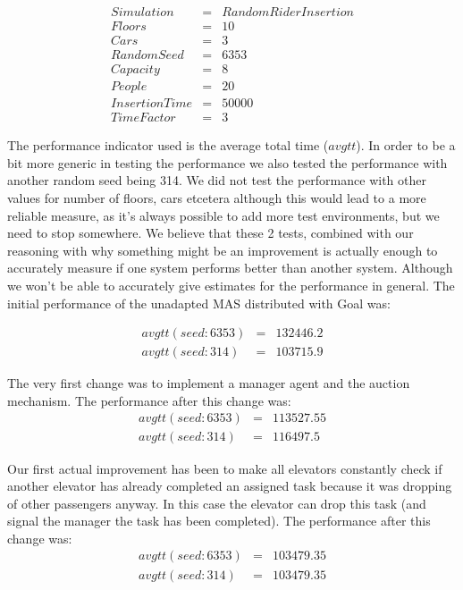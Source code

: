 \documentclass[a4paper,11pt]{article}
\begin{document}
\[\begin{array}{lcl}
Simulation & = & Random Rider Insertion\\
Floors & = & 10\\
Cars & = & 3\\
RandomSeed & = & 6353\\
Capacity & = & 8\\
People & = & 20\\
InsertionTime & = & 50000\\
TimeFactor & = & 3
\end{array}\] 

\pagebreak

The performance indicator used is the average total time ($avgtt$). In order to be a bit more generic in testing the performance we also tested the performance with another random seed being 314. We did not test the performance with other values for number of floors, cars etcetera although this would lead to a more reliable measure, as it's always possible to add more test environments, but we need to stop somewhere. We believe that these 2 tests, combined with our reasoning with why something might be an improvement is actually enough to accurately measure if one system performs better than another system. Although we won't be able to accurately give estimates for the performance in general.
\newline\newline
The initial performance of the unadapted MAS distributed with Goal was:

\[\begin{array}{lcl}
avgtt (seed: 6353) & = & 132446.2\\
avgtt (seed: 314) & = & 103715.9
\end{array}\]

The very first change was to implement a manager agent and the auction mechanism. The performance after this change was:
\[\begin{array}{lcl}
avgtt (seed: 6353) & = & 113527.55\\
avgtt (seed: 314) & = & 116497.5
\end{array}\]


Our first actual improvement has been to make all elevators constantly check if another elevator has already completed an assigned task because it was dropping of other passengers anyway. In this case the elevator can drop this task (and signal the manager the task has been completed). The performance after this change was:
\[\begin{array}{lcl}
avgtt (seed: 6353) & = & 103479.35\\
avgtt (seed: 314) & = & 103479.35
\end{array}\]
\end{document}
